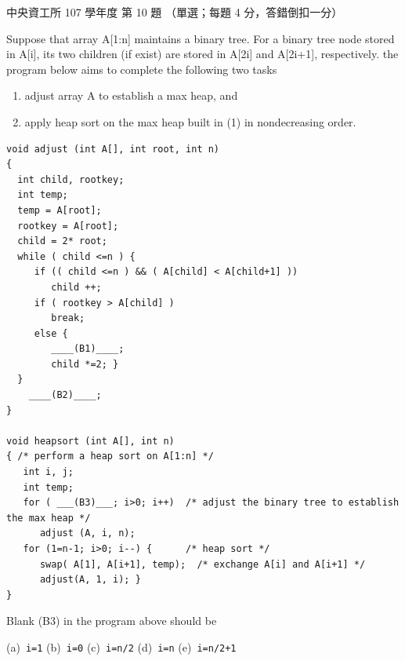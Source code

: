 \begin{pastexam}[label={px:ncu-107-dsa-10}]{中央資工所 107 學年度 第 10 題}
（單選；每題 4 分，答錯倒扣一分）

Suppose that array A[1:n] maintains a binary tree. For a binary tree node stored in A[i], its two
children (if exist) are stored in A[2i] and A[2i+1], respectively. the program below aims to
complete the following two tasks
\begin{enumerate}[label=(\arabic*)]
\item adjust array A to establish a max heap, and
\item apply heap sort on the max heap built in (1) in nondecreasing order.
\end{enumerate}
\begin{verbatim}
void adjust (int A[], int root, int n)
{
  int child, rootkey;
  int temp;
  temp = A[root];
  rootkey = A[root];
  child = 2* root;
  while ( child <=n ) {
     if (( child <=n ) && ( A[child] < A[child+1] ))
        child ++;
     if ( rootkey > A[child] )
        break;
     else {
        ____(B1)____;
        child *=2; }
  }
    ____(B2)____;
}

void heapsort (int A[], int n)
{ /* perform a heap sort on A[1:n] */
   int i, j;
   int temp;
   for ( ___(B3)___; i>0; i++)  /* adjust the binary tree to establish the max heap */
      adjust (A, i, n);
   for (1=n-1; i>0; i--) {      /* heap sort */
      swap( A[1], A[i+1], temp);  /* exchange A[i] and A[i+1] */
      adjust(A, 1, i); }
}
\end{verbatim}

Blank (B3) in the program above should be

(a)~\texttt{i=1} \qquad (b)~\texttt{i=0} \qquad (c)~\texttt{i=n/2} \qquad (d)~\texttt{i=n} \qquad
(e)~\texttt{i=n/2+1}
\end{pastexam}

